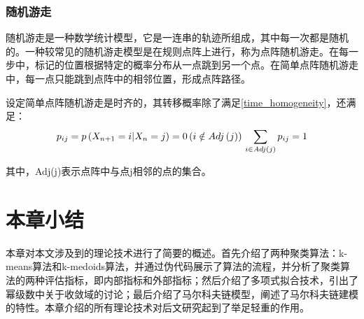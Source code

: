 \subsubsection{随机游走}
随机游走是一种数学统计模型，它是一连串的轨迹所组成，其中每一次都是随机的。一种较常见的随机游走模型是在规则点阵上进行，称为点阵随机游走。在每一步中，标记的位置根据特定的概率分布从一点跳到另一个点。在简单点阵随机游走中，每一点只能跳到点阵中的相邻位置，形成点阵路径。

设定简单点阵随机游走是时齐的，其转移概率除了满足\ref{time_homogeneity}，还满足：
\begin{equation}
\label{random_walk}
p_{ij}=p\left( X_{n+1}=i|X_n=j \right) =0 \left( i\notin Adj\left( j \right) \right) 
\\
\sum_{i\in Adj\left( j \right)}{p_{ij}=1}
\end{equation}

其中，Adj(j)表示点阵中与点j相邻的点的集合。

\section{本章小结}

本章对本文涉及到的理论技术进行了简要的概述。首先介绍了两种聚类算法：k-means算法和k-medoids算法，并通过伪代码展示了算法的流程，并分析了聚类算法的两种评估指标，即内部指标和外部指标；然后介绍了多项式拟合技术，引出了幂级数中关于收敛域的讨论；最后介绍了马尔科夫链模型，阐述了马尔科夫链建模的特性。本章介绍的所有理论技术对后文研究起到了举足轻重的作用。